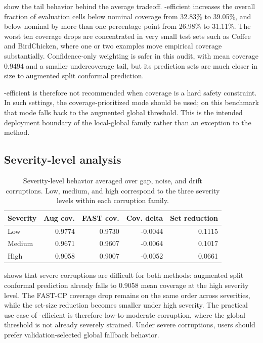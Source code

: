  show the tail behavior behind the average tradeoff. \fastcp{}-efficient increases the overall fraction of evaluation cells below nominal coverage from 32.83\% to 39.05\%, and below nominal by more than one percentage point from 26.98\% to 31.11\%. The worst ten coverage drops are concentrated in very small test sets such as Coffee and BirdChicken, where one or two examples move empirical coverage substantially. Confidence-only weighting is safer in this audit, with mean coverage 0.9494 and a smaller undercoverage tail, but its prediction sets are much closer in size to augmented split conformal prediction.

\fastcp{}-efficient is therefore not recommended when coverage is a hard safety constraint. In such settings, the coverage-prioritized mode should be used; on this benchmark that mode falls back to the augmented global threshold. This is the intended deployment boundary of the local-global family rather than an exception to the method.

\subsection{Severity-level analysis}

\begin{table}[t]
\centering
\small
\caption{Severity-level behavior averaged over gap, noise, and drift corruptions. Low, medium, and high correspond to the three severity levels within each corruption family.}
\label{tab:severity_summary}
\begin{tabular}{lrrrr}
\toprule
Severity & Aug cov. & FAST cov. & Cov. delta & Set reduction \\
\midrule
Low & 0.9774 & 0.9730 & -0.0044 & 0.1115 \\
Medium & 0.9671 & 0.9607 & -0.0064 & 0.1017 \\
High & 0.9058 & 0.9007 & -0.0052 & 0.0661 \\
\bottomrule
\end{tabular}
\end{table}

 shows that severe corruptions are difficult for both methods: augmented split conformal prediction already falls to 0.9058 mean coverage at the high severity level. The FAST-CP coverage drop remains on the same order across severities, while the set-size reduction becomes smaller under high severity. The practical use case of \fastcp{}-efficient is therefore low-to-moderate corruption, where the global threshold is not already severely strained. Under severe corruptions, users should prefer validation-selected global fallback behavior.

